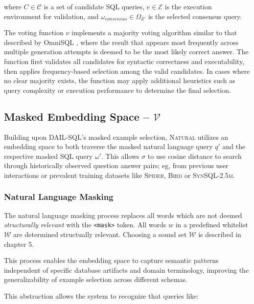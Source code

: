 where $C \in \mathcal{C}$ is a set of candidate SQL queries, $e \in \mathcal{E}$ is
the execution environment for validation, and $\omega_{consensus} \in \Omega_{\mathcal{S}'}$
is the selected consensus query.

\vspace{0.5em}

The voting function $\nu$ implements a majority voting algorithm similar to that
described by OmniSQL \citep{OmniSQL}, where the result that appears most frequently
across multiple generation attempts is deemed to be the most likely correct answer.
The function first validates all candidates for syntactic correctness and executability,
then applies frequency-based selection among the valid candidates. In cases where
no clear majority exists, the function may apply additional heuristics such as query
complexity or execution performance to determine the final selection.

\subsection{Masked Embedding Space – $\mathcal{V}$}

Building upon DAIL-SQL's masked example selection, \textsc{Natural} utilizes an
embedding space to both traverse the masked natural language query $q'$
and the respective masked SQL query $\omega'$. This allows $\sigma$ to use
cosine distance to search through historically observed question answer pairs;
eg, from previous user interactions or prevalent training datasets like
\textsc{Spider}, \textsc{Bird} or \textsc{SynSQL-2.5m}.

\subsubsection{Natural Language Masking}

The natural language masking process replaces all words which are not deemed
\textit{structurally relevant} with the \texttt{<mask>} token. All words $w$
in a predefined whitelist $\mathcal{W}$ are determined structually relevant.
Choosing a sound set $\mathcal{W}$ is described in chapter 5.

This process enables the embedding space to capture semantic patterns independent
of specific database artifacts and domain terminology, improving the generalizability
of example selection across different schemas.

This abstraction allows the system to recognize that queries like:

